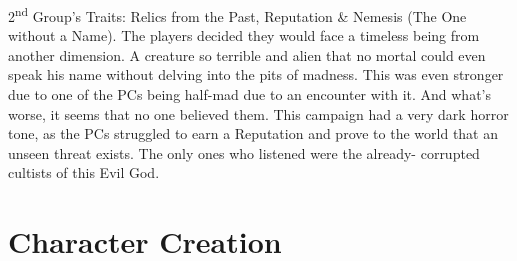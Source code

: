 \begin{multicols}{2}
\begin{mog}
2\textsuperscript{nd} Group's Traits: Relics from the Past, Reputation
\& Nemesis (The One without a Name). The players
decided they would face a timeless being from another
dimension. A creature so terrible and alien that no mortal
could even speak his name without delving into the pits
of madness. This was even stronger due to one of the PCs
being half-mad due to an encounter with it. And what’s
worse, it seems that no one believed them. This campaign
had a very dark horror tone, as the PCs struggled to earn
a Reputation and prove to the world that an unseen threat
exists. The only ones who listened were the already-
corrupted cultists of this Evil God.
\end{mog}
\end{multicols}

\section{Character Creation}
